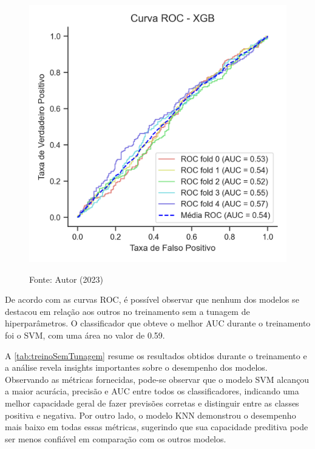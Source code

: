 \begin{figure}[htb]
\begin{minipage}[t]{0.28\textwidth}
	\end{minipage}
	\hfill
	\begin{minipage}[t]{0.28\textwidth}
		\centering
		\includegraphics[width=\textwidth]{USPSC-img/Curva ROC - XGB.png}
	\end{minipage}
	
	\begin{center}
		Fonte: Autor (2023)
	\end{center}
\end{figure}

De acordo com as curvas ROC, é possível observar que nenhum dos modelos se destacou em relação aos outros no treinamento sem a tunagem de hiperparâmetros. O classificador que obteve o melhor AUC durante o treinamento foi o SVM, com uma área no valor de 0.59.

A \autoref{tab:treinoSemTunagem} resume os resultados obtidos durante o treinamento e a análise revela insights importantes sobre o desempenho dos modelos. Observando as métricas fornecidas, pode-se observar que o modelo SVM alcançou a maior acurácia, precisão e AUC entre todos os classificadores, indicando uma melhor capacidade geral de fazer previsões corretas e distinguir entre as classes positiva e negativa. Por outro lado, o modelo KNN demonstrou o desempenho mais baixo em todas essas métricas, sugerindo que sua capacidade preditiva pode ser menos confiável em comparação com os outros modelos.


